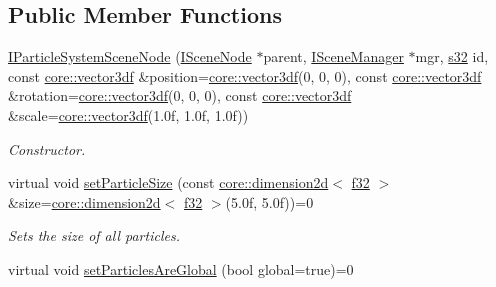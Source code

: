 \subsection*{Public Member Functions}
\begin{DoxyCompactItemize}
\item 
\mbox{\label{classirr_1_1scene_1_1IParticleSystemSceneNode_a41c24f2388af5451d23f25c79b95295a}} 
\hyperlink{classirr_1_1scene_1_1IParticleSystemSceneNode_a41c24f2388af5451d23f25c79b95295a}{I\+Particle\+System\+Scene\+Node} (\hyperlink{classirr_1_1scene_1_1ISceneNode}{I\+Scene\+Node} $\ast$parent, \hyperlink{classirr_1_1scene_1_1ISceneManager}{I\+Scene\+Manager} $\ast$mgr, \hyperlink{namespaceirr_ac66849b7a6ed16e30ebede579f9b47c6}{s32} id, const \hyperlink{namespaceirr_1_1core_a06f169d08b5c429f5575acb7edbad811}{core\+::vector3df} \&position=\hyperlink{namespaceirr_1_1core_a06f169d08b5c429f5575acb7edbad811}{core\+::vector3df}(0, 0, 0), const \hyperlink{namespaceirr_1_1core_a06f169d08b5c429f5575acb7edbad811}{core\+::vector3df} \&rotation=\hyperlink{namespaceirr_1_1core_a06f169d08b5c429f5575acb7edbad811}{core\+::vector3df}(0, 0, 0), const \hyperlink{namespaceirr_1_1core_a06f169d08b5c429f5575acb7edbad811}{core\+::vector3df} \&scale=\hyperlink{namespaceirr_1_1core_a06f169d08b5c429f5575acb7edbad811}{core\+::vector3df}(1.\+0f, 1.\+0f, 1.\+0f))
\begin{DoxyCompactList}\small\item\em Constructor. \end{DoxyCompactList}\item 
\mbox{\label{classirr_1_1scene_1_1IParticleSystemSceneNode_a17e1abe0feb0b57e96bf49d984bcbb86}} 
virtual void \hyperlink{classirr_1_1scene_1_1IParticleSystemSceneNode_a17e1abe0feb0b57e96bf49d984bcbb86}{set\+Particle\+Size} (const \hyperlink{classirr_1_1core_1_1dimension2d}{core\+::dimension2d}$<$ \hyperlink{namespaceirr_a0277be98d67dc26ff93b1a6a1d086b07}{f32} $>$ \&size=\hyperlink{classirr_1_1core_1_1dimension2d}{core\+::dimension2d}$<$ \hyperlink{namespaceirr_a0277be98d67dc26ff93b1a6a1d086b07}{f32} $>$(5.\+0f, 5.\+0f))=0
\begin{DoxyCompactList}\small\item\em Sets the size of all particles. \end{DoxyCompactList}\item 
virtual void \hyperlink{classirr_1_1scene_1_1IParticleSystemSceneNode_adc1c12bd7bf1a075f00c5dafa3aff266}{set\+Particles\+Are\+Global} (bool global=true)=0

\end{DoxyCompactItemize}
